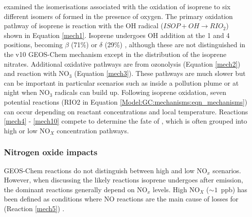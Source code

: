     \textcite{Crounse2011} examined the isomerisations associated with the oxidation of isoprene to six different isomers of \roo formed in the presence of oxygen.
    The primary oxidation pathway of isoprene is reaction with the OH radical ($ ISOP + OH \to RIO_2 $) shown in Equation \ref{mech1}.
    Isoprene undergoes OH addition at the 1 and 4 positions, becoming $\beta$ (71\%) or $\delta$ (29\%) \roo, although these are not distinguished in the v10 GEOS-Chem mechanism except in the distribution of the isoprene nitrates. 
    Additional oxidative pathways are from ozonolysis (Equation \ref{mech2}) and reaction with NO$_3$ (Equation \ref{mech3}).
    These pathways are much slower but can be important in particular scenarios such as inside a pollution plume or at night when NO$_3$ radicals can build up.
    Following isoprene oxidation, seven potential \roo reactions (RIO2 in Equation \ref{Model:GC:mechanisms:eqn_mechanisms}) can occur depending on reactant concentrations and local temperature.
    Reactions \ref{mech4} - \ref{mech10} compete to determine the fate of \roo, which is often grouped into high or low NO$_X$ concentration pathways.
    

    \subsubsection{Nitrogen oxide impacts}

      GEOS-Chem reactions do not distinguish between high and low NO$_x$ scenarios.
      However, when discussing the likely reactions isoprene undergoes after emission, the dominant reactions generally depend on NO$_x$ levels.
      High NO$_X$ ($\sim 1$~ppb) has been defined as conditions where NO reactions are the main cause of losses for \roo (Reaction \ref{mech5}) \parencite{Palmer2003}.
      
